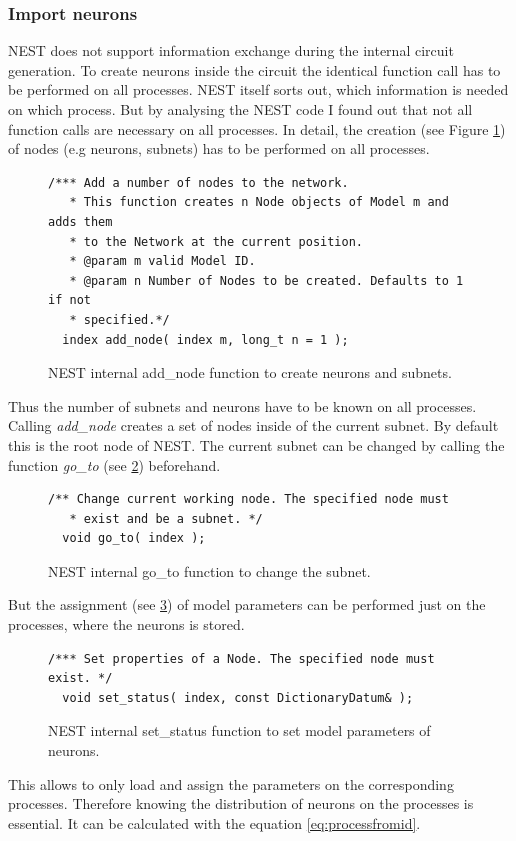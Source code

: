 \subsubsection{Import neurons}
NEST does not support information exchange during the internal circuit generation. 
To create neurons inside the circuit the identical function call has to be
performed on all processes. NEST itself sorts out, which information is needed on which process.
But by analysing the NEST code I found out that not all function calls are necessary on all processes.
In detail, the creation (see Figure \ref{code:addnode}) of nodes (e.g neurons, subnets) has to be performed on all processes.
\begin{figure}[ht!]
\begin{lstlisting}[style=cppcode]
/*** Add a number of nodes to the network.
   * This function creates n Node objects of Model m and adds them
   * to the Network at the current position.
   * @param m valid Model ID.
   * @param n Number of Nodes to be created. Defaults to 1 if not
   * specified.*/
  index add_node( index m, long_t n = 1 );
\end{lstlisting}
\caption{NEST internal add\_{}node function to create neurons and subnets.}
\label{code:addnode}
\end{figure}
Thus the number of subnets and neurons have to be known on all processes.
Calling \emph{add\_node} creates a set of nodes inside of the current subnet.
By default this is the root node of NEST.
The current subnet can be changed by calling the function \emph{go\_to} (see \ref{code:goto}) beforehand.
\begin{figure}[ht!]
\begin{lstlisting}[style=cppcode]
/** Change current working node. The specified node must
   * exist and be a subnet. */
  void go_to( index );
\end{lstlisting}
\caption{NEST internal go\_{}to function to change the subnet.}
\label{code:goto}
\end{figure}
But the assignment (see \ref{code:setstatus}) of model parameters can be performed just on the processes,
where the neurons is stored.
\begin{figure}[ht!]
\begin{lstlisting}[style=cppcode]
/*** Set properties of a Node. The specified node must exist. */
  void set_status( index, const DictionaryDatum& );
\end{lstlisting}
\caption{NEST internal set\_{}status function to set model parameters of neurons.}
\label{code:setstatus}
\end{figure}
This allows to only load and assign the parameters on the corresponding processes.
Therefore knowing the distribution of neurons on the processes is essential.
It can be calculated with the equation \ref{eq:processfromid}.

